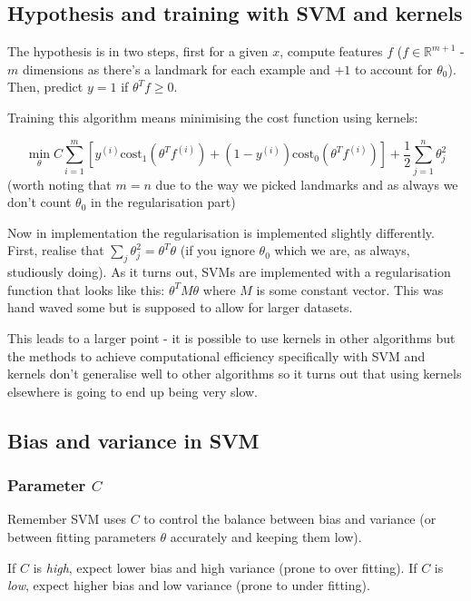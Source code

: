 \subsection{Hypothesis and training with SVM and kernels}

The hypothesis is in two steps, first for a given $x$, compute features $f$ ($f \in \mathbb{R}^{m+1}$ - $m$ dimensions as there's a landmark for each example and $+1$ to account for $\theta_0$). Then, predict $y = 1$ if $\theta^Tf \geq 0$.

Training this algorithm means minimising the cost function using kernels:

\begin{equation}
\min_\theta C
\sum_{i = 1}^{m}
\left[
y^{(i)} \textrm{cost}_1(\theta^Tf^{(i)}) +
(1-y^{(i)})\textrm{cost}_0(\theta^Tf^{(i)})
\right]
+ \frac{1}{2}\sum_{j = 1}^{n}\theta_j^2
\end{equation}
(worth noting that $m = n$ due to the way we picked landmarks and as always we don't count $\theta_0$ in the regularisation part)

Now in implementation the regularisation is implemented slightly differently. First, realise that $\sum_j\theta_j^2 = \theta^T\theta$ (if you ignore $\theta_0$ which we are, as always, studiously doing). As it turns out, SVMs are implemented with a regularisation function that looks like this: $\theta^TM\theta$ where $M$ is some constant vector. This was hand waved some but is supposed to allow for larger datasets.

This leads to a larger point - it is possible to use kernels in other algorithms but the methods to achieve computational efficiency specifically with SVM and kernels don't generalise well to other algorithms so it turns out that using kernels elsewhere is going to end up being very slow.

\subsection{Bias and variance in SVM}

\subsubsection{Parameter $C$}

Remember SVM uses $C$ to control the balance between bias and variance (or between fitting parameters $\theta$ accurately and keeping them low).

If $C$ is \emph{high}, expect lower bias and high variance (prone to over fitting). If $C$ is \emph{low}, expect higher bias and low variance (prone to under fitting).

